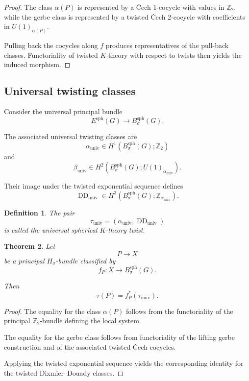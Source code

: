 \documentclass[11pt]{amsart}
\newtheorem{definition}{Definition}[section]
\newtheorem{theorem}[definition]{Theorem}
\begin{document}
\begin{proof}
The class \(\alpha(P)\) is represented by a Čech \(1\)-cocycle with values in
\(\mathbb Z_2\), while the gerbe class is represented by a twisted Čech
\(2\)-cocycle with coefficients in \(U(1)_{\alpha(P)}\).

Pulling back the cocycles along \(f\) produces representatives of the pull-back
classes. Functoriality of twisted \(K\)-theory with respect to twists then
yields the induced morphism.
\end{proof}

\subsection{Universal twisting classes}

Consider the universal principal bundle
\[
E^{\mathrm{sph}}(G)
\longrightarrow
B^{\mathrm{sph}}_\sigma(G).
\]

The associated universal twisting classes are
\[
\alpha_{\mathrm{univ}}
\in
H^1(B^{\mathrm{sph}}_\sigma(G);\mathbb Z_2)
\]
and
\[
\beta_{\mathrm{univ}}
\in
H^2(B^{\mathrm{sph}}_\sigma(G);
U(1)_{\alpha_{\mathrm{univ}}}).
\]

Their image under the twisted exponential sequence defines
\[
\operatorname{DD}_{\mathrm{univ}}
\in
H^3(B^{\mathrm{sph}}_\sigma(G);
\mathbb Z_{\alpha_{\mathrm{univ}}}).
\]

\begin{definition}
The pair
\[
\tau_{\mathrm{univ}}
=
(\alpha_{\mathrm{univ}},\operatorname{DD}_{\mathrm{univ}})
\]
is called the \emph{universal spherical \(K\)-theory twist}.
\end{definition}

\begin{theorem}
Let
\[
P\to X
\]
be a principal \(H_\sigma\)-bundle classified by
\[
f_P:X\to B^{\mathrm{sph}}_\sigma(G).
\]

Then
\[
\tau(P)
=
f_P^*(\tau_{\mathrm{univ}}).
\]
\end{theorem}

\begin{proof}
The equality for the class \(\alpha(P)\) follows from the functoriality of the
principal \(\mathbb Z_2\)-bundle defining the local system.

The equality for the gerbe class follows from functoriality of the lifting
gerbe construction and of the associated twisted Čech cocycles.

Applying the twisted exponential sequence yields the corresponding identity for
the twisted Dixmier--Douady classes.
\end{proof}
\end{document}

